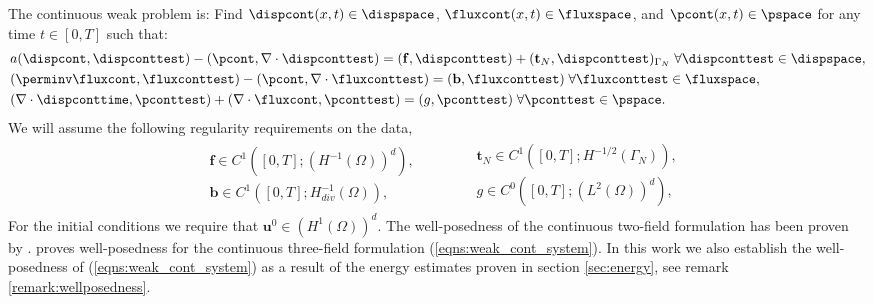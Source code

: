 The continuous weak problem is: Find $\dispcont(x,t) \in \dispspace$, $\fluxcont(x,t) \in \fluxspace$, and $\pcont(x,t) \in \pspace$ for any time $t\in[0,T]$ such that:
\begin{subequations}
\label{eqns:weak_cont_system}
\begin{align}
& a(\dispcont,\dispconttest) - (\pcont,\nabla \cdot \dispconttest)=(\mathbf{f},\dispconttest) + (\mathbf{t}_{N},\dispconttest)_{\Gamma_{N}} \; \forall \dispconttest\in \dispspace,
\label{eqn:weak_cont_elast_mom} \\
&(\perminv \fluxcont,\fluxconttest) - (\pcont,\nabla \cdot \fluxconttest) = (\mathbf{b},\fluxconttest)
\; \forall\fluxconttest\in \fluxspace,
\label{eqn:weak_cont_flux_mom} \\
&(\nabla \cdot  {\dispconttime},\pconttest) + (\nabla \cdot \fluxcont,\pconttest) = (g,\pconttest) \; \forall\pconttest\in \pspace. \label{eqn:weak_cont_mass}
\end{align}
\end{subequations}
We will assume the following regularity requirements on the data,
\begin{equation}
\label{eqns:weak_cont_system_data}
\begin{gathered}\begin{aligned}
&\mathbf{f}\in C^{1}([0,T]; (H^{-1}(\Omega))^{d}),  \\
&\mathbf{b}\in C^{1}([0,T]; H_{div}^{-1}(\Omega)),
\end{aligned}\end{gathered}
\qquad
\begin{gathered}\begin{aligned}
&\mathbf{t}_{N}\in C^{1}([0,T]; H^{-1/2}(\Gamma_{N})), \\
&g\in C^{0}([0,T]; (L^{2}(\Omega))^{d}),
\end{aligned}\end{gathered}
\end{equation}
For the initial conditions we require that $\mathbf{u}^{0} \in  (H^{1}(\Omega))^{d}$.
{The well-posedness of the continuous two-field formulation has been proven by \cite{showalter2000diffusion}. \cite{lipnikov2002numerical} proves well-posedness for the continuous three-field formulation (\ref{eqns:weak_cont_system}). In this work we also establish the well-posedness of (\ref{eqns:weak_cont_system}) as a result of the energy estimates proven in section \ref{sec:energy}, see remark \ref{remark:wellposedness}.}

